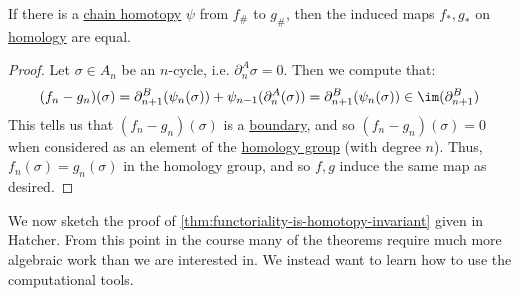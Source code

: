 \begin{theorem}\label{thm:chain-homotopies-on-homology}
	If there is a \hyperref[def:chain-homotopy]{chain homotopy} $\psi$ from $f_\#$ to $g_\#$, then the induced maps \(f_\ast, g_\ast\) on \hyperref[def:homology-group]{homology} are equal.
\end{theorem}
\begin{proof}
	Let $\sigma \in A_n$ be an $n$-cycle, i.e. $\partial_n^A \sigma = 0$. Then we compute that:
	\begin{align*}
		(f_n - g_n)(\sigma) = \partial_{n + 1}^B(\psi_n(\sigma)) + \psi_{n - 1}(\partial_n^A(\sigma)) = \partial_{n + 1}^B(\psi_n(\sigma)) \in \im (\partial^B_{n + 1})
	\end{align*}
	This tells us that $(f_n - g_n)(\sigma)$ is a \hyperref[def:boundary]{boundary}, and so $(f_n - g_n)(\sigma) = 0$ when considered as an element of
	the \hyperref[def:homology-group]{homology group} (with degree \(n\)).
	Thus, $f_n(\sigma) = g_n(\sigma)$ in the homology group, and so $f, g$ induce the same map as desired.
\end{proof}
We now sketch the proof of \autoref{thm:functoriality-is-homotopy-invariant} given in Hatcher\cite{hatcher2002algebraic}. From this point in the course many
of the theorems require much more algebraic work than we are interested in. We instead want to learn how to use the computational tools.

